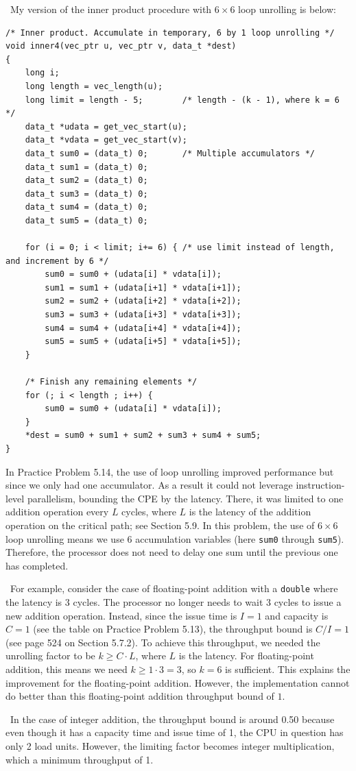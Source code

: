 \documentclass[12pt]{article}
\newenvironment{sol}[1][Solution]{\begin{trivlist}
		\item[\hskip \labelsep {\bfseries #1:}]}{\end{trivlist}}
\begin{document}
\begin{sol}
	\
	My version of the inner product procedure with $6\times 6$ loop unrolling is below:
	\begin{lstlisting}
/* Inner product. Accumulate in temporary, 6 by 1 loop unrolling */
void inner4(vec_ptr u, vec_ptr v, data_t *dest)
{
	long i;
	long length = vec_length(u);
	long limit = length - 5; 		/* length - (k - 1), where k = 6 */
	data_t *udata = get_vec_start(u);
	data_t *vdata = get_vec_start(v);
	data_t sum0 = (data_t) 0;		/* Multiple accumulators */
	data_t sum1 = (data_t) 0;
	data_t sum2 = (data_t) 0;
	data_t sum3 = (data_t) 0;
	data_t sum4 = (data_t) 0;
	data_t sum5 = (data_t) 0;
	
	for (i = 0; i < limit; i+= 6) {	/* use limit instead of length, and increment by 6 */
		sum0 = sum0 + (udata[i] * vdata[i]);
		sum1 = sum1 + (udata[i+1] * vdata[i+1]);
		sum2 = sum2 + (udata[i+2] * vdata[i+2]);
		sum3 = sum3 + (udata[i+3] * vdata[i+3]);
		sum4 = sum4 + (udata[i+4] * vdata[i+4]);
		sum5 = sum5 + (udata[i+5] * vdata[i+5]);
	}
	
	/* Finish any remaining elements */
	for (; i < length ; i++) {
		sum0 = sum0 + (udata[i] * vdata[i]);
	}
	*dest = sum0 + sum1 + sum2 + sum3 + sum4 + sum5;
}
	\end{lstlisting}
	In Practice Problem 5.14, the use of loop unrolling improved performance but since we only had
	one accumulator. As a result it could not leverage instruction-level parallelism,
	bounding the CPE by the latency. There, it was limited to one addition operation every
	$L$ cycles, where $L$ is the latency of the addition operation on the critical path;
	see Section 5.9. In this problem, the use of $6\times 6$ loop unrolling means we use 6
	accumulation variables (here \texttt{sum0} through \texttt{sum5}). Therefore, the processor
	does not need to  delay one sum until the previous one has completed.
	
	\
	For example, consider the case of floating-point addition with a \texttt{double} where the
	latency is 3 cycles. The processor no longer needs to wait 3 cycles to issue a new addition
	operation. Instead, since the issue time is $I = 1$ and capacity is $C=1$ (see the table on
	Practice Problem 5.13), the throughput bound is $C/I = 1$ (see page 524 on Section 5.7.2).
	To achieve this throughput, we needed the unrolling factor to be $k\geq C\cdot L$, where $L$ is
	the latency. For floating-point addition, this means we need $k\geq 1\cdot 3=3$, so $k=6$ is
	sufficient. This explains the improvement for the floating-point addition. However, the
	implementation cannot do better than this floating-point addition throughput bound of $1$.
	
	\
	In the case of integer addition, the throughput bound is around 0.50 because even though
	it has a capacity time and issue time of 1, the CPU in question has only 2 load units.
	However, the limiting factor becomes integer multiplication, which a minimum throughput
	of 1.
\end{sol}
\end{document}
